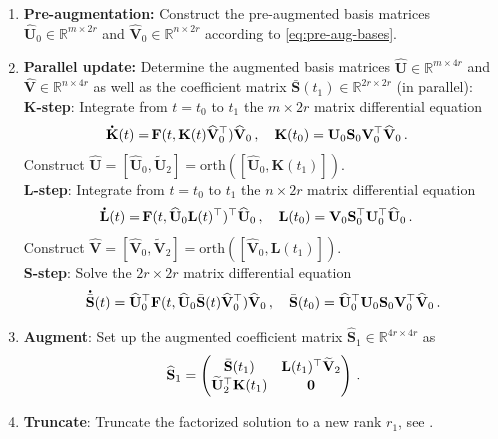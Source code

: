 \documentclass[preprint,runningheads]{svjour3}
\newcommand*{\dt}[1]{ \accentset{\mbox{\large\bfseries .}}{#1}}
\def\wh{\widehat}
\newcommand\bfF{{\mathbf F}}
\newcommand\bfK{{\mathbf K}}
\newcommand\bfL{{\mathbf L}}
\newcommand\bfS{{\mathbf S}}
\newcommand\bfU{{\mathbf U}}
\newcommand\bfV{{\mathbf V}}
\begin{document}
\begin{enumerate}
\item {\bf Pre-augmentation:} Construct the pre-augmented basis matrices $\wh\bfU_0\in \mathbb{R}^{m\times 2r}$ and $\wh\bfV_0\in \mathbb{R}^{n\times 2r}$ according to \eqref{eq:pre-aug-bases}.
\item {\bf Parallel update:} Determine the augmented basis matrices $\widehat{\mathbf{U}}\in \mathbb{R}^{m\times 4r}$ and $\widehat{\mathbf{V}}\in \mathbb{R}^{n\times 4r}$ as well as the coefficient matrix $\bar{\mathbf{S}}(t_1) \in\mathbb{R}^{2r \times 2r}$ (in parallel):
\\[2mm]
\textbf{K-step}: Integrate from $t=t_0$ to $t_1$ the $m \times 2r$ matrix differential equation
\begin{align*}
\dt{\bfK}(t) =\,& \bfF(t,\bfK(t)\widehat \bfV_0^{\top})\widehat \bfV_0\, , \quad \bfK(t_0) = \bfU_0 \bfS_0 \bfV_0^{\top}\widehat{\bfV}_0\, .
\end{align*}
Construct $\widehat \bfU= [\widehat \bfU_0, \widetilde \bfU_2] = \text{orth}([\widehat \bfU_0, \bfK(t_1)])$. 
\\[2mm]
\textbf{L-step}: Integrate from $t=t_0$ to $t_1$ the $n \times 2r$ matrix differential equation
\begin{align*}
\dt{\bfL}(t) =\,& \bfF(t,\widehat \bfU_0 \bfL(t)^{\top})^{\top}\widehat \bfU_0\, , \quad \bfL(t_0) = \bfV_0 \bfS_0^{\top} \bfU_0^{\top}\widehat{\bfU}_0\, .
\end{align*}
Construct $\widehat \bfV= [\widehat \bfV_0, \widetilde \bfV_2] = \text{orth}([\widehat \bfV_0, \bfL(t_1)])$. 
\\[2mm]
\textbf{S-step}: Solve the $2r \times 2r$ matrix differential equation
\begin{align*}
\dt{\bar \bfS}(t) = \widehat \bfU_0^{\top}\bfF(t,\widehat{\bfU}_0\bar \bfS(t)\widehat{\bfV}_0^{\top})\widehat \bfV_0\, , \quad \bar \bfS(t_0) = \widehat{\bfU}_0^{\top}\bfU_0 \bfS_0 \bfV_0^{\top}\widehat{\bfV}_0\, .
\end{align*}
\item \textbf{Augment}: Set up the augmented coefficient matrix $\widehat{\bfS}_1 \in\mathbb{R}^{4r\times 4r}$ as
\begin{align*}
\widehat{\bfS}_1 = \begin{pmatrix}
\bar{\bfS}(t_1) & \bfL(t_1)^{\top}\widetilde \bfV_2\\
\widetilde \bfU_2^{\top} \bfK(t_1) & \bf0
\end{pmatrix}\, .
\end{align*}
\item \textbf{Truncate}: Truncate the factorized solution to a new rank $r_1$, see \cite{ceruti2023rank}.
\end{enumerate}
\end{document}

